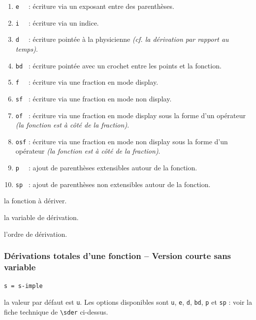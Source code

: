 \documentclass[12pt,a4paper]{book}
\newcommand\env[1]{\texttt{#1}}
\newcommand\macro[1]{\env{\textbackslash{}#1}}
\theoremstyle{definition}
\newcommand\mwhyprefix[2]{%
	\texttt{#1 = #1-#2}%
}
\begin{document}
{{\begin{enumerate}
	\item \verb+e  + : écriture via un exposant entre des parenthèses.
	
	\item \verb+i  + : écriture via un indice.

	\item \verb+d  + : écriture pointée à la physicienne \emph{(cf. la dérivation par rapport au temps)}.

	\item \verb+bd + : écriture pointée avec un crochet entre les points et la fonction.

	\medskip
	
	\item \verb+f  + : écriture via une fraction en mode display.

	\item \verb+sf + : écriture via une fraction en mode non display.

	\item \verb+of + : écriture via une fraction en mode display sous la forme d'un opérateur \emph{(la fonction est à côté de la fraction)}.

	\item \verb+osf+ : écriture via une fraction en mode non display sous la forme d'un opérateur \emph{(la fonction est à côté de la fraction)}.

	\medskip
	
	\item \verb+p  + : ajout de parenthèses extensibles autour de la fonction.

	\item \verb+sp + : ajout de parenthèses non extensibles autour de la fonction.
\end{enumerate}


 la fonction à dériver.

 la variable de dérivation.

 l'ordre de dérivation.




\subsubsection{Dérivations totales d'une fonction -- Version courte sans variable} \label{tnsana-short-der}



 \hfill \mwhyprefix{s}{imple}

\IDoption{} la valeur par défaut est \verb+u+. Les options disponibles sont \verb+u+, \verb+e+, \verb+d+, \verb+bd+, \verb+p+ et \verb+sp+ : voir la fiche technique de \macro{sder} ci-dessus.

}}
\end{document}
